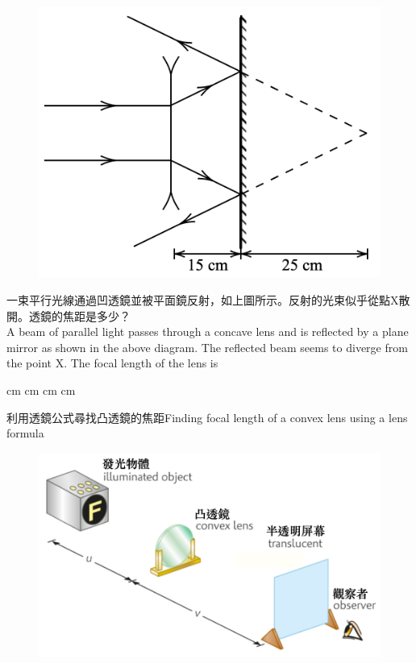 \documentclass[beamer=true]{standalone}
\begin{document}
\begin{eg}
    \begin{figure}
        \centering
        \includegraphics[width=0.5\linewidth]{assets/n8xu1980d23x23.png}
    \end{figure}
    一束平行光線通過凹透鏡並被平面鏡反射，如上圖所示。反射的光束似乎從點X散開。透鏡的焦距是多少？\\
    A beam of parallel light passes through a concave lens and is reflected by a plane mirror as shown in the above diagram. The reflected beam seems to diverge from the point X. The focal length of the lens is
\end{eg}
\begin{eg}
    \begin{tasks}
         cm
         cm
         cm
         cm
    \end{tasks}
\end{eg}

\begin{frame}{利用透鏡公式尋找凸透鏡的焦距Finding focal length of a convex lens using a lens formula}
    \begin{figure}
        \centering
        \includegraphics[width=1\linewidth]{assets/xu89n32r2r2frf.png}
    \end{figure}

\end{frame}
\end{document}
